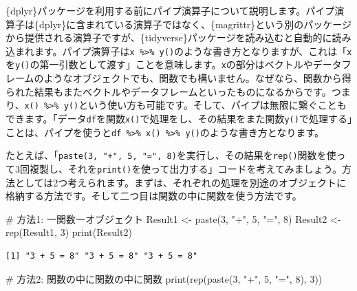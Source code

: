 \documentclass[
  a4paper,
  pandoc,
  ja=standard,
  jafont=haranoaji]{bxjsbook}
\newenvironment{Shaded}{\begin{snugshade}}{\end{snugshade}}
\newcommand{\CommentTok}[1]{\textcolor[rgb]{0.37,0.37,0.37}{#1}}
\newcommand{\DecValTok}[1]{\textcolor[rgb]{0.68,0.00,0.00}{#1}}
\newcommand{\FunctionTok}[1]{\textcolor[rgb]{0.28,0.35,0.67}{#1}}
\newcommand{\NormalTok}[1]{\textcolor[rgb]{0.00,0.48,0.65}{#1}}
\newcommand{\OtherTok}[1]{\textcolor[rgb]{0.00,0.48,0.65}{#1}}
\newcommand{\StringTok}[1]{\textcolor[rgb]{0.13,0.47,0.30}{#1}}
\begin{document}
\{dplyr\}パッケージを利用する前にパイプ演算子について説明します。パイプ演算子は\{dplyr\}に含まれている演算子ではなく、\{magrittr\}という別のパッケージから提供される演算子ですが、\{tidyverse\}パッケージを読み込むと自動的に読み込まれます。パイプ演算子は\texttt{x\ \%\textgreater{}\%\ y()}のような書き方となりますが、これは「\texttt{x}を\texttt{y()}の第一引数として渡す」ことを意味します。\texttt{x}の部分はベクトルやデータフレームのようなオブジェクトでも、関数でも構いません。なぜなら、関数から得られた結果もまたベクトルやデータフレームといったものになるからです。つまり、\texttt{x()\ \%\textgreater{}\%\ y()}という使い方も可能です。そして、パイプは無限に繋ぐこともできます。「データ\texttt{df}を関数\texttt{x()}で処理をし、その結果をまた関数\texttt{y()}で処理する」ことは、パイプを使うと\texttt{df\ \%\textgreater{}\%\ x()\ \%\textgreater{}\%\ y()}のような書き方となります。

たとえば、「\texttt{paste(3,\ "+",\ 5,\ "=",\ 8)}を実行し、その結果を\texttt{rep()}関数を使って3回複製し、それを\texttt{print()}を使って出力する」コードを考えてみましょう。方法としては2つ考えられます。まずは、それぞれの処理を別途のオブジェクトに格納する方法です。そして二つ目は関数の中に関数を使う方法です。

\begin{Shaded}
\begin{Highlighting}[numbers=left,,]
\CommentTok{\# 方法1: 一関数一オブジェクト}
\NormalTok{Result1 }\OtherTok{\textless{}{-}} \FunctionTok{paste}\NormalTok{(}\DecValTok{3}\NormalTok{, }\StringTok{"+"}\NormalTok{, }\DecValTok{5}\NormalTok{, }\StringTok{"="}\NormalTok{, }\DecValTok{8}\NormalTok{)}
\NormalTok{Result2 }\OtherTok{\textless{}{-}} \FunctionTok{rep}\NormalTok{(Result1, }\DecValTok{3}\NormalTok{)}
\FunctionTok{print}\NormalTok{(Result2)}
\end{Highlighting}
\end{Shaded}

\begin{verbatim}
[1] "3 + 5 = 8" "3 + 5 = 8" "3 + 5 = 8"
\end{verbatim}

\begin{Shaded}
\begin{Highlighting}[numbers=left,,]
\CommentTok{\# 方法2: 関数の中に関数の中に関数}
\FunctionTok{print}\NormalTok{(}\FunctionTok{rep}\NormalTok{(}\FunctionTok{paste}\NormalTok{(}\DecValTok{3}\NormalTok{, }\StringTok{"+"}\NormalTok{, }\DecValTok{5}\NormalTok{, }\StringTok{"="}\NormalTok{, }\DecValTok{8}\NormalTok{), }\DecValTok{3}\NormalTok{))}
\end{Highlighting}
\end{Shaded}
\end{document}
